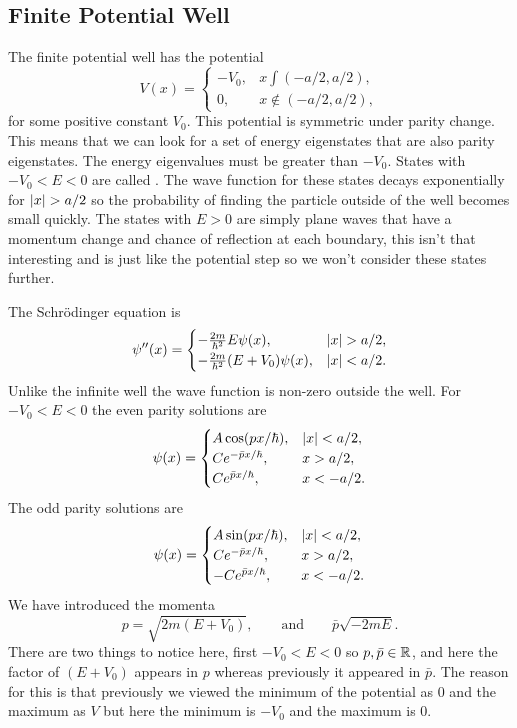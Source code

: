     \subsection{Finite Potential Well}
    The finite potential well has the potential
    \[
        V(x) = 
        \begin{cases}
            -V_0, & x\int(-a/2, a/2),\\
            0, & x\notin(-a/2, a/2),
        \end{cases}
    \]
    for some positive constant \(V_0\).
    This potential is symmetric under parity change.
    This means that we can look for a set of energy eigenstates that are also parity eigenstates.
    The energy eigenvalues must be greater than \(-V_0\).
    States with \(-V_0 < E < 0\) are called .
    The wave function for these states decays exponentially for \(\abs{x} > a/2\) so the probability of finding the particle outside of the well becomes small quickly.
    The states with \(E > 0\) are simply plane waves that have a momentum change and chance of reflection at each boundary, this isn't that interesting and is just like the potential step so we won't consider these states further.
    
    The Schr\"odinger equation is
    \[
        \psi''(x) = 
        \begin{cases}
            -\frac{2m}{\hbar^2}E\psi(x), & \abs{x} > a/2,\\
            -\frac{2m}{\hbar^2}(E + V_0)\psi(x), & \abs{x} < a/2.
        \end{cases}
    \]
    Unlike the infinite well the wave function is non-zero outside the well.
    For \(-V_0 < E < 0\) the even parity solutions are
    \[
        \psi(x) =
        \begin{cases}
           A\cos(px/\hbar), & \abs{x} < a/2,\\
           Ce^{-\bar{p}x/\hbar}, & x > a/2,\\
           Ce^{\bar{p}x/\hbar}, & x < -a/2.
        \end{cases}
    \]
    The odd parity solutions are
    \[
        \psi(x) =
        \begin{cases}
            A\sin(px/\hbar), & \abs{x} < a/2,\\
            Ce^{-\bar{p}x/\hbar}, & x > a/2,\\
            -Ce^{\bar{p}x/\hbar}, & x < -a/2.
        \end{cases}
    \]
    We have introduced the momenta
    \[p = \sqrt{2m(E + V_0)},\qquad\text{and}\qquad \bar{p}\sqrt{-2mE}.\]
    There are two things to notice here, first \(-V_0 < E < 0\) so \(p, \bar{p}\in\mathbb{R}\), and here the factor of \((E + V_0)\) appears in \(p\) whereas previously it appeared in \(\bar{p}\).
    The reason for this is that previously we viewed the minimum of the potential as \(0\) and the maximum as \(V\) but here the minimum is \(-V_0\) and the maximum is \(0\).
    
